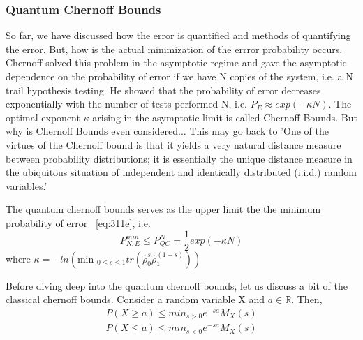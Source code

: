 \subsubsection{Quantum Chernoff Bounds}
So far, we have discussed how the error is quantified and methods of quantifying the error. But, how is the actual minimization of the errror probability occurs. Chernoff solved this problem in the asymptotic regime and gave the asymptotic dependence on the probability of error if we have N copies of the system, i.e. a N trail hypothesis testing.\cite{chernoffref} He showed that the probability of error decreases exponentially with the number of tests performed N, i.e. $P_E \approx exp(-\kappa N)$. The optimal exponent $\kappa$ arising in the asymptotic limit is called Chernoff Bounds\cite{chernoffref}. But why is Chernoff Bounds even considered... This may go back to 'One of the virtues of the Chernoff bound is that it yields a very natural distance measure between probability distributions; it is essentially the unique distance measure in the ubiquitous situation of independent and identically distributed (i.i.d.) random variables.'\cite{chernoffref}

The quantum chernoff bounds serves as the upper limit the the minimum probability of error ~\ref{eq:311e}, i.e.
\begin{equation}
    P_{N,E}^{min} \le P_{QC}^N = \frac{1}{2}exp(-\kappa N)
\end{equation}
where $\kappa = -ln\left(\text{min }_{0\le s \le 1} tr(\hat{\rho}_0^s \hat{\rho}_1^{(1 - s)})\right)$

Before diving deep into the quantum chernoff bounds, let us discuss a bit of the classical chernoff bounds. Consider a random variable X and $a \in \mathbb{R}$.
Then, \cite{pbcourse_chernoff}
\begin{equation}
    \begin{split}
        P(X \ge a) \le min_{s > 0} e^{-sa} M_X(s) \\
        P(X \le a) \le min_{s < 0} e^{-sa} M_X(s)
    \end{split}
\end{equation}

